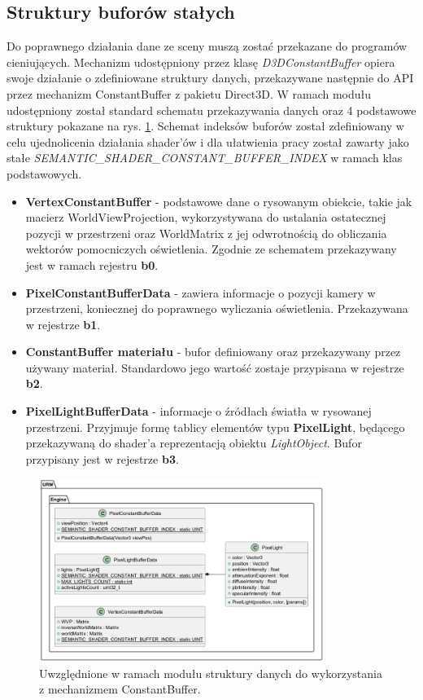 \subsection{Struktury buforów stałych}
	Do poprawnego działania dane ze sceny muszą zostać przekazane do programów cieniujących. Mechanizm udostępniony przez klasę \textit{D3DConstantBuffer} opiera swoje działanie o zdefiniowane struktury danych, przekazywane następnie do API przez mechanizm ConstantBuffer z pakietu Direct3D. W ramach modułu udostępniony został standard schematu przekazywania danych oraz 4 podstawowe struktury pokazane na rys. \ref{UML_StandardConstantBuffers}. Schemat indeksów buforów został zdefiniowany w celu ujednolicenia działania shader'ów i dla ułatwienia pracy został zawarty jako stałe \textit{SEMANTIC\_SHADER\_CONSTANT\_BUFFER\_INDEX} w ramach klas podstawowych.
	\begin{itemize}
		\item \textbf{VertexConstantBuffer} - podstawowe dane o rysowanym obiekcie, takie jak macierz WorldViewProjection, wykorzystywana do ustalania ostatecznej pozycji w przestrzeni oraz WorldMatrix z jej odwrotnością do obliczania wektorów pomocniczych oświetlenia. Zgodnie ze schematem przekazywany jest w ramach rejestru \textbf{b0}.
		\item \textbf{PixelConstantBufferData} - zawiera informacje o pozycji kamery w przestrzeni, koniecznej do poprawnego wyliczania oświetlenia. Przekazywana w rejestrze \textbf{b1}.
		\item \textbf{ConstantBuffer materiału} - bufor definiowany oraz przekazywany przez używany materiał. Standardowo jego wartość zostaje przypisana w rejestrze \textbf{b2}.
		\item \textbf{PixelLightBufferData} - informacje o źródłach światła w rysowanej przestrzeni. Przyjmuje formę tablicy elementów typu \textbf{PixelLight}, będącego przekazywaną do shader'a reprezentacją obiektu \textit{LightObject}. Bufor przypisany jest w rejestrze \textbf{b3}.
	\end{itemize}
	
	\begin{figure}[h!]
		\centering
		\includegraphics[width=350px]{images/UML/constantbuffers.png}
		\caption{Uwzględnione w ramach modułu struktury danych do wykorzystania z mechanizmem ConstantBuffer.}
		\label{UML_StandardConstantBuffers}
	\end{figure}
	
